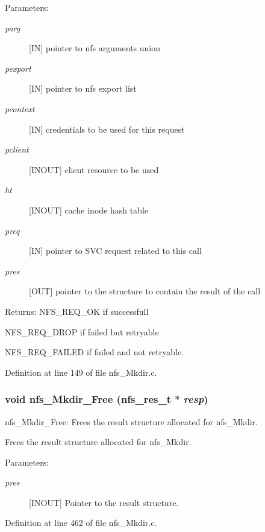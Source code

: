 \begin{Desc}
\item[Parameters:]
\begin{description}
\item[{\em parg}][IN] pointer to nfs arguments union \item[{\em pexport}][IN] pointer to nfs export list \item[{\em pcontext}][IN] credentials to be used for this request \item[{\em pclient}][INOUT] client resource to be used \item[{\em ht}][INOUT] cache inode hash table \item[{\em preq}][IN] pointer to SVC request related to this call \item[{\em pres}][OUT] pointer to the structure to contain the result of the call\end{description}
\end{Desc}
\begin{Desc}
\item[Returns:]NFS\_\-REQ\_\-OK if successfull \par
 NFS\_\-REQ\_\-DROP if failed but retryable \par
 NFS\_\-REQ\_\-FAILED if failed and not retryable. \end{Desc}


Definition at line 149 of file nfs\_\-Mkdir.c.
\subsubsection[{nfs\_\-Mkdir\_\-Free}]{\setlength{\rightskip}{0pt plus 5cm}void nfs\_\-Mkdir\_\-Free (nfs\_\-res\_\-t $\ast$ {\em resp})}\label{nfs__Mkdir_8c_22feb265c8dc65333618da08a366ac09}


nfs\_\-Mkdir\_\-Free: Frees the result structure allocated for nfs\_\-Mkdir.

Frees the result structure allocated for nfs\_\-Mkdir.

\begin{Desc}
\item[Parameters:]
\begin{description}
\item[{\em pres}][INOUT] Pointer to the result structure. \end{description}
\end{Desc}


Definition at line 462 of file nfs\_\-Mkdir.c.